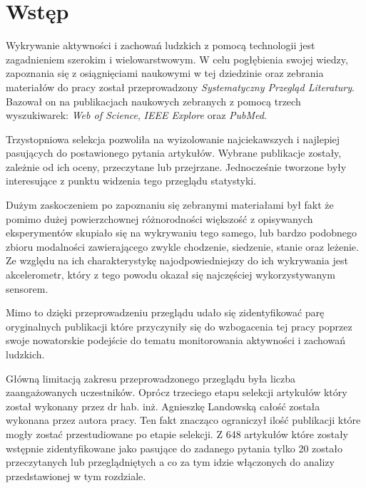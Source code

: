 \section{Wstęp}
Wykrywanie aktywności i zachowań ludzkich z pomocą technologii jest zagadnieniem szerokim i wielowarstwowym. W celu pogłębienia swojej wiedzy, zapoznania się z osiągnięciami naukowymi w tej dziedzinie oraz zebrania materiałów do pracy został przeprowadzony \textit{Systematyczny Przegląd Literatury}. Bazował on na publikacjach naukowych zebranych z pomocą trzech wyszukiwarek: \textit{Web of Science}, \textit{IEEE Explore} oraz \textit{PubMed}. 

Trzystopniowa selekcja pozwoliła na wyizolowanie najciekawszych i najlepiej pasujących do postawionego pytania artykułów. Wybrane publikacje zostały, zależnie od ich oceny, przeczytane lub przejrzane. Jednocześnie tworzone były interesujące z punktu widzenia tego przeglądu statystyki. 

Dużym zaskoczeniem po zapoznaniu się zebranymi materiałami był fakt że pomimo dużej powierzchownej  różnorodności większość z opisywanych eksperymentów skupiało się na wykrywaniu tego samego, lub bardzo podobnego zbioru modalności zawierającego zwykle chodzenie, siedzenie, stanie oraz leżenie. Ze względu na ich charakterystykę najodpowiedniejszy do ich wykrywania jest akcelerometr, który z tego powodu okazał się najczęściej wykorzystywanym sensorem.

Mimo to dzięki przeprowadzeniu przeglądu udało się zidentyfikować parę oryginalnych publikacji które przyczyniły się do wzbogacenia tej pracy poprzez swoje nowatorskie podejście do tematu monitorowania aktywności i zachowań ludzkich.

Główną limitacją zakresu przeprowadzonego przeglądu była liczba zaangażowanych uczestników. Oprócz trzeciego etapu selekcji artykułów który został wykonany przez dr hab. inż. Agnieszkę Landowską całość została wykonana przez autora pracy. Ten fakt znacząco ograniczył ilość publikacji które mogły zostać przestudiowane po etapie selekcji. Z 648 artykułów które zostały wstępnie zidentyfikowane jako pasujące do zadanego pytania tylko 20 zostało przeczytanych lub przeglądniętych a co za tym idzie włączonych do analizy przedstawionej w tym rozdziale.
